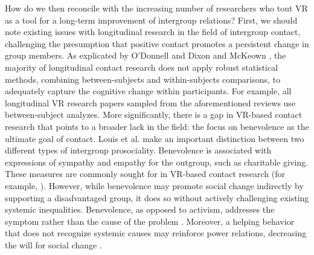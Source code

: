 \documentclass[dissertation,math,vertlayout,pdfa,colorlinks,nologo]{aaltoseries}
\begin{document}
How do we then reconcile with the increasing number of researchers who tout VR as a tool for a long-term improvement of intergroup relations? First, we should note existing issues with longitudinal research in the field of intergroup contact, challenging the presumption that positive contact promotes a persistent change in group members. As explicated by O'Donnell \cite{odonnellTechnologicalAnalyticalAdvancements2021} and Dixon and McKeown \cite{dixonNegativeContactCollective2021}, the majority of longitudinal contact research does not apply robust statistical methods, combining between-subjects and within-subjects comparisons, to adequately capture the cognitive change within participants. For example, all longitudinal VR research papers sampled from the aforementioned reviews \cite{herreraBuildingLongtermEmpathy2018,loonVirtualRealityPerspectivetaking2018,hassonEnemysGazeImmersive2019} use between-subject analyzes. More significantly, there is a gap in VR-based contact research that points to a broader lack in the field: the focus on benevolence as the ultimate goal of contact. Louis et al. \cite{louisEmergingResearchIntergroup2019} make an important distinction between two different types of intergroup prosociality. Benevolence is associated with expressions of sympathy and empathy for the outgroup, such as charitable giving. These measures are commonly sought for in VR-based contact research (for example, \cite{loonVirtualRealityPerspectivetaking2018,derricoProsocialVirtualReality2020, branhamVirtualImmersiveContact2024}). However, while benevolence may promote social change indirectly by supporting a disadvantaged group, it does so without actively challenging existing systemic inequalities. Benevolence, as opposed to activism, addresses the symptom rather than the cause of the problem \cite{louisEmergingResearchIntergroup2019}. Moreover, a helping behavior that does not recognize systemic causes may reinforce power relations, decreasing the will for social change \cite{nadlerInterGroupHelping2002}. 
\end{document}
